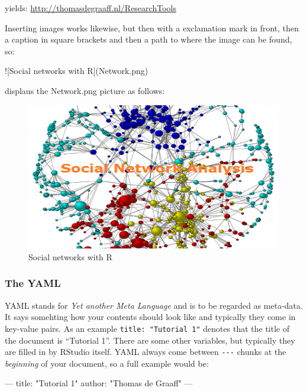\documentclass[]{article}
\newenvironment{Shaded}{\begin{snugshade}}{\end{snugshade}}
\newcommand{\AlertTok}[1]{\textcolor[rgb]{0.94,0.16,0.16}{#1}}
\newcommand{\NormalTok}[1]{#1}
\theoremstyle{definition}
\theoremstyle{definition}
\theoremstyle{definition}
\theoremstyle{remark}
\begin{document}
yields: \href{ResearchTools}{http://thomasdegraaff.nl/ResearchTools}

Inserting images works likewise, but then with a exclamation mark in
front, then a caption in square brackets and then a path to where the
image can be found, so:

\begin{Shaded}
\begin{Highlighting}[]
\AlertTok{![Social networks with R](Network.png)}
\end{Highlighting}
\end{Shaded}

displaus the Network.png picture as follows:

\begin{figure}
\centering
\includegraphics{Network.png}
\caption{Social networks with R}
\end{figure}

\subsubsection{The YAML}\label{the-yaml}

YAML stands for \emph{Yet another Meta Language} and is to be regarded
as meta-data. It says somehting how your contents should look like and
typically they come in key-value pairs. As an example
\texttt{title:\ "Tutorial\ 1"} denotes that the title of the document is
``Tutorial 1''. There are some other variables, but typically they are
filled in by RStudio itself. YAML always come between \texttt{-\/-\/-}
chunks at the \emph{beginning} of your document, so a full example would
be:

\begin{Shaded}
\begin{Highlighting}[]
\NormalTok{---}
\NormalTok{title: "Tutorial 1"}
\NormalTok{author: "Thomas de Graaff"}
\NormalTok{---}
\end{Highlighting}
\end{Shaded}
\end{document}
